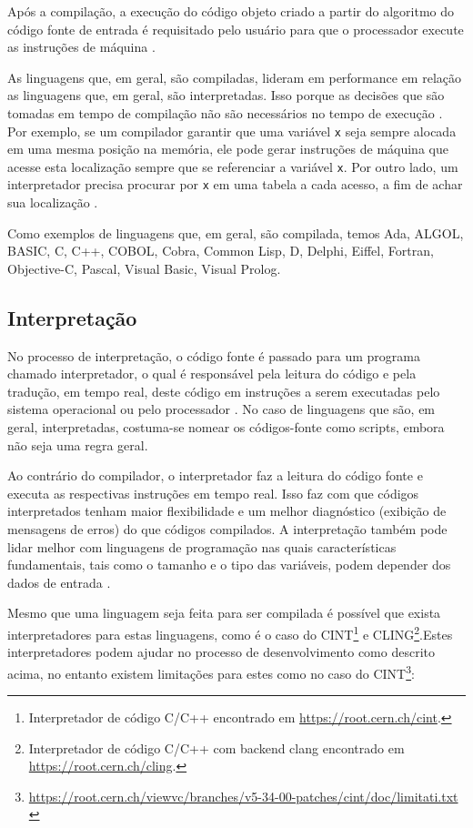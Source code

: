 Após a compilação, a execução do código objeto criado a partir do algoritmo do
 código fonte de entrada é requisitado pelo usuário para que o processador 
execute as instruções de máquina \cite[pág. 17]{ref6}.

As linguagens que, em geral, são compiladas, lideram em performance em relação
 as linguagens que, em geral, são interpretadas. Isso porque as decisões que são
 tomadas em tempo de compilação não são necessários no tempo de execução \cite[pág. 2]{ref3}.
Por exemplo, se um compilador garantir que uma variável \texttt{x} seja sempre alocada 
em uma  mesma posição na memória,  ele pode gerar instruções de máquina que 
acesse esta localização sempre que se referenciar a variável \texttt{x}. 
Por outro lado, um interpretador precisa procurar  por \texttt{x} em uma tabela a cada 
acesso, a fim de achar sua localização \cite[pág. 167]{ref2}.

Como exemplos de linguagens que, em geral, são compilada, temos Ada, ALGOL, 
BASIC, C, C++, COBOL, Cobra, Common Lisp, D, Delphi, Eiffel, Fortran, 
Objective-C, Pascal, Visual Basic, Visual Prolog.

\subsection{Interpretação}

No processo de interpretação, o código fonte é passado para um programa chamado
 interpretador, o qual é responsável pela leitura do código e pela tradução, 
em tempo real, deste código em instruções a serem executadas pelo sistema 
operacional ou  pelo processador \cite{ref2}. No caso de linguagens que são, em geral, 
interpretadas, costuma-se nomear os códigos-fonte como scripts, embora não seja 
uma regra geral.

Ao contrário do compilador, o interpretador faz a leitura do código fonte e 
executa  as respectivas instruções em tempo real. Isso faz com que  códigos 
interpretados tenham maior flexibilidade e um melhor diagnóstico (exibição de 
mensagens de erros) do que  códigos compilados. A interpretação também pode lidar 
melhor com linguagens de programação nas quais características fundamentais, 
tais como  o tamanho e  o tipo das variáveis, podem depender dos dados de 
entrada \cite[pág. 17]{ref6}.

Mesmo que uma linguagem seja feita para ser compilada é possível que exista 
interpretadores para estas linguagens, como é o caso do CINT\footnote{
Interpretador de código C/C++ encontrado em \url{https://root.cern.ch/cint}.}
 e CLING\footnote{Interpretador de código C/C++ com backend clang encontrado em
  \url{https://root.cern.ch/cling}.}.Estes interpretadores podem ajudar no 
  processo de desenvolvimento como descrito acima, no entanto existem 
  limitações para estes como no caso do CINT\footnote{
  \url{https://root.cern.ch/viewvc/branches/v5-34-00-patches/cint/doc/limitati.txt }}:

